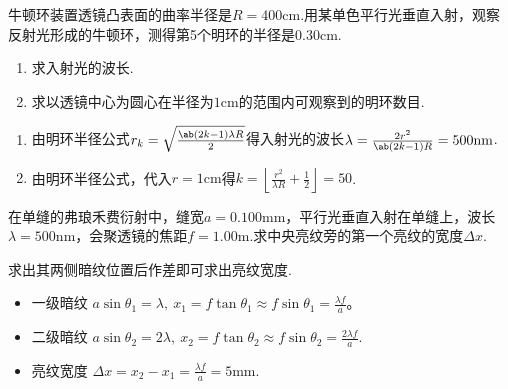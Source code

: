 \begin{problem}[牛顿环][8]
    牛顿环装置透镜凸表面的曲率半径是$R=400\mathrm{cm}$.用某单色平行光垂直入射，观察反射光形成的牛顿环，测得第5个明环的半径是$0.30\mathrm{cm}$.
    \begin{enumerate}
        \item 求入射光的波长.
        \item 求以透镜中心为圆心在半径为$1\mathrm{cm}$的范围内可观察到的明环数目.
    \end{enumerate}
\end{problem}
\begin{solution}
    \begin{enumerate}
    \item 由明环半径公式$r_k=\sqrt{\frac{\ab(2k-1)\lambda R}{2}}$得入射光的波长$\lambda=\frac{2r^2}{\ab(2k-1)R}=500\mathrm{nm}$.
    \item 由明环半径公式，代入$r=1\mathrm{cm}$得$k=\left\lfloor\frac{r^2}{\lambda R}+\frac{1}{2}\right\rfloor=50$.
    \end{enumerate}
\end{solution}

\begin{problem}[弗琅禾费衍射][5]
在单缝的弗琅禾费衍射中，缝宽$a=0.100\mathrm{mm}$，平行光垂直入射在单缝上，波长$\lambda=500\mathrm{nm}$，会聚透镜的焦距$f=1.00\mathrm{m}$.求中央亮纹旁的第一个亮纹的宽度$\Delta x$.
\end{problem}
\begin{solution}
    求出其两侧暗纹位置后作差即可求出亮纹宽度.
\begin{itemize}
    \item 一级暗纹
    $a\sin\theta_1=\lambda,\ x_1=f\tan\theta_1\approx f\sin\theta_1=\frac{\lambda f}{a}$。
    \item 二级暗纹
    $a\sin\theta_2=2\lambda,\ x_2=f\tan\theta_2\approx f\sin\theta_2=\frac{2\lambda f}{a}$.
    \item 亮纹宽度
    $\Delta x=x_2-x_1=\frac{\lambda f}{a}=5\mathrm{mm}$.
\end{itemize}
\end{solution}